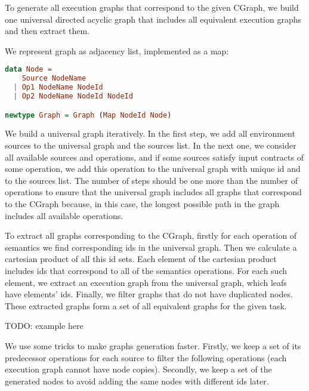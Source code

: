 To generate all execution graphs that correspond to the given CGraph, we build one universal directed acyclic graph that includes all equivalent execution graphs and then extract them.

We represent graph as adjacency list, implemented as a map:

\begin{lstlisting}[language=Haskell]
data Node =
    Source NodeName
  | Op1 NodeName NodeId
  | Op2 NodeName NodeId NodeId

newtype Graph = Graph (Map NodeId Node)
\end{lstlisting}


We build a universal graph iteratively.
In the first step, we add all environment sources to the universal graph and the sources list.
In the next one, we consider all available sources and operations, and if some sources satisfy input contracts of some operation, we add this operation to the universal graph with unique id and to the sources list.
The number of steps should be one more than the number of operations to ensure that the universal graph includes all graphs that correspond to the CGraph because, in this case, the longest possible path in the graph includes all available operations.

To extract all graphs corresponding to the CGraph, firstly for each operation of semantics we find corresponding ids in the universal graph.
Then we calculate a cartesian product of all this id sets.
Each element of the cartesian product includes ids that correspond to all of the semantics operations.
For each such element, we extract an execution graph from the universal graph, which leafs have elements' ids.
Finally, we filter graphs that do not have duplicated nodes.
These extracted graphs form a set of all equivalent graphs for the given task.

TODO: example here

We use some tricks to make graphs generation faster.
Firstly, we keep a set of its predecessor operations for each source to filter the following operations (each execution graph cannot have node copies).
Secondly, we keep a set of the generated nodes to avoid adding the same nodes with different ids later.



